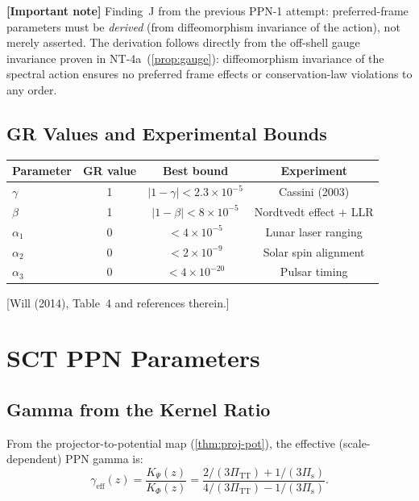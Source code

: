 \documentclass[11pt,a4paper]{article}
\theoremstyle{plain}
\theoremstyle{definition}
\theoremstyle{remark}
\newcommand{\fromlit}[1]{\textcolor{blue!70!black}{\textsf{[#1]}}}
\newcommand{\signcorrection}[1]{%
  \par\smallskip\noindent
  \colorbox{red!10}{\parbox{\dimexpr\linewidth-2\fboxsep}{%
    \textcolor{red!60!black}{\textbf{[Important note]}} #1}}%
  \par\smallskip}
\begin{document}
\signcorrection{Finding~J from the previous PPN-1 attempt:
preferred-frame parameters must be \emph{derived} (from
diffeomorphism invariance of the action), not merely asserted.
The derivation follows directly from the off-shell gauge invariance
proven in NT-4a~(\cref{prop:gauge}): diffeomorphism invariance of the
spectral action ensures no preferred frame effects or
conservation-law violations to any order.}

\subsection{GR Values and Experimental Bounds}

\begin{center}
\begin{tabular}{lccc}
\toprule
Parameter & GR value & Best bound & Experiment \\
\midrule
$\gamma$ & 1 & $|1-\gamma| < 2.3\times 10^{-5}$ & Cassini (2003) \\
$\beta$ & 1 & $|1-\beta| < 8\times 10^{-5}$ & Nordtvedt effect + LLR \\
$\alpha_1$ & 0 & $< 4\times 10^{-5}$ & Lunar laser ranging \\
$\alpha_2$ & 0 & $< 2\times 10^{-9}$ & Solar spin alignment \\
$\alpha_3$ & 0 & $< 4\times 10^{-20}$ & Pulsar timing \\
\bottomrule
\end{tabular}
\end{center}

\fromlit{Will (2014), Table~4 and references therein.}

\section{SCT PPN Parameters}\label{sec:sct-ppn}

\subsection{Gamma from the Kernel Ratio}

From the projector-to-potential map (\cref{thm:proj-pot}), the
effective (scale-dependent) PPN gamma is:
\begin{equation}\label{eq:gamma-eff}
  \boxed{\gamma_{\mathrm{eff}}(z)
  = \frac{K_\Psi(z)}{K_\Phi(z)}
  = \frac{2/(3\Pi_{\mathrm{TT}}) + 1/(3\Pi_{\mathrm{s}})}
         {4/(3\Pi_{\mathrm{TT}}) - 1/(3\Pi_{\mathrm{s}})}.}
\end{equation}
\end{document}
